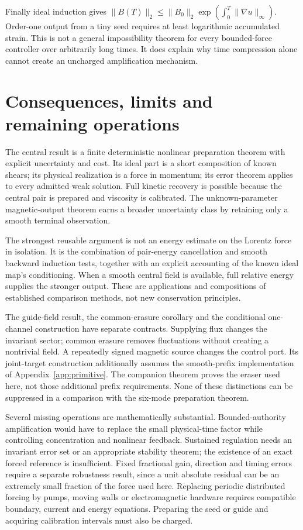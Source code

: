 \documentclass[11pt,a4paper]{amsart}
\theoremstyle{definition}
\theoremstyle{remark}
\numberwithin{equation}{section}
\newcommand{\norm}[1]{\lVert #1\rVert}
\begin{document}
Finally ideal induction gives
$\norm{B(T)}_2\le\norm{B_0}_2
\exp(\int_0^T\norm{\nabla u}_\infty)$.
Order-one output from a tiny seed requires at least logarithmic accumulated strain. This is not a general impossibility theorem for every bounded-force controller over arbitrarily long times. It does explain why time compression alone cannot create an uncharged amplification mechanism.



\section{Consequences, limits and remaining operations}\label{sec:discussion}

The central result is a finite deterministic nonlinear preparation theorem with explicit uncertainty and cost. Its ideal part is a short composition of known shears; its physical realization is a force in momentum; its error theorem applies to every admitted weak solution. Full kinetic recovery is possible because the central pair is prepared and viscosity is calibrated. The unknown-parameter magnetic-output theorem earns a broader uncertainty class by retaining only a smooth terminal observation.

The strongest reusable argument is not an energy estimate on the Lorentz force in isolation. It is the combination of pair-energy cancellation and smooth backward induction tests, together with an explicit accounting of the known ideal map's conditioning. When a smooth central field is available, full relative energy supplies the stronger output. These are applications and compositions of established comparison methods, not new conservation principles.

The guide-field result, the common-erasure corollary and the conditional one-channel construction have separate contracts. Supplying flux changes the invariant sector; common erasure removes fluctuations without creating a nontrivial field. A repeatedly signed magnetic source changes the control port. Its joint-target construction additionally assumes the smooth-prefix implementation of Appendix~\ref{app:primitive}. The companion theorem proves the eraser used here, not those additional prefix requirements. None of these distinctions can be suppressed in a comparison with the six-mode preparation theorem.

Several missing operations are mathematically substantial. Bounded-authority amplification would have to replace the small physical-time factor while controlling concentration and nonlinear feedback. Sustained regulation needs an invariant error set or an appropriate stability theorem; the existence of an exact forced reference is insufficient. Fixed fractional gain, direction and timing errors require a separate robustness result, since a unit absolute residual can be an extremely small fraction of the force used here. Replacing periodic distributed forcing by pumps, moving walls or electromagnetic hardware requires compatible boundary, current and energy equations. Preparing the seed or guide and acquiring calibration intervals must also be charged.
\end{document}
